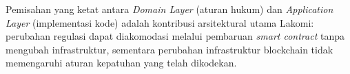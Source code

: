Pemisahan yang ketat antara \textit{Domain Layer} (aturan hukum) dan \textit{Application Layer} (implementasi kode) adalah kontribusi arsitektural utama Lakomi: perubahan regulasi dapat diakomodasi melalui pembaruan \textit{smart contract} tanpa mengubah infrastruktur, sementara perubahan infrastruktur blockchain tidak memengaruhi aturan kepatuhan yang telah dikodekan.




